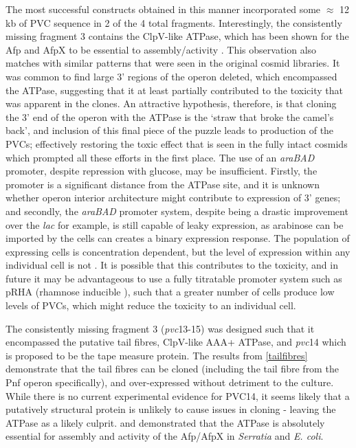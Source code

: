 The most successful constructs obtained in this manner incorporated some $\approx$ 12 kb of PVC sequence in 2 of the 4 total fragments. Interestingly, the consistently missing fragment 3 contains the ClpV-like ATPase, which has been shown for the Afp and AfpX to be essential to assembly/activity \citep{Rybakova2015, Hurst2018}. This observation also matches with similar patterns that were seen in the original cosmid libraries. It was common to find large 3' regions of the operon deleted, which encompassed the ATPase, suggesting that it at least partially contributed to the toxicity that was apparent in the clones. An attractive hypothesis, therefore, is that cloning the 3' end of the operon with the ATPase is the `straw that broke the camel's back', and inclusion of this final piece of the puzzle leads to production of the PVCs; effectively restoring the toxic effect that is seen in the fully intact cosmids which prompted all these efforts in the first place. The use of an \emph{araBAD} promoter, despite repression with glucose, may be insufficient. Firstly, the promoter is a significant distance from the ATPase site, and it is unknown whether operon interior architecture might contribute to expression of 3' genes; and secondly, the \emph{araBAD} promoter system, despite being a drastic improvement over the \emph{lac} for example, is still capable of leaky expression, as arabinose can be imported by the cells can creates a binary expression response. The population of expressing cells is concentration dependent, but the level of expression within any individual cell is not \citep{Siegele1997, Khlebnikov2000}. It is possible that this contributes to the toxicity, and in future it may be advantageous to use a fully titratable promoter system such as pRHA (rhamnose inducible \citep{Giacalone2006}), such that a greater number of cells produce low levels of PVCs, which might reduce the toxicity to an individual cell. 

The consistently missing fragment 3 (\emph{pvc}13-15) was designed such that it encompassed the putative tail fibres, ClpV-like AAA+ ATPase, and \emph{pvc}14 which is proposed to be the tape measure protein. The results from \vref{tailfibres} demonstrate that the tail fibres can be cloned (including the tail fibre from the Pnf operon specifically), and over-expressed without detriment to the culture. While there is no current experimental evidence for PVC14, it seems likely that a putatively structural protein is unlikely to cause issues in cloning - leaving the ATPase as a likely culprit. \cite{Rybakova2015} and \cite{Hurst2018} demonstrated that the ATPase is absolutely essential for assembly and activity of the Afp/AfpX in \emph{Serratia} and \emph{E. coli}.

